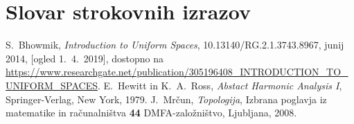 \documentclass[mat1]{fmfdelo}
\begin{document}
\section*{Slovar strokovnih izrazov}

\geslo{}{}
\geslo{}{}

\begin{thebibliography}{99}

S.~Bhowmik, \emph{Introduction to Uniform Spaces}, 10.13140/RG.2.1.3743.8967, junij 2014, [ogled 1.~4.~2019], dostopno na \url{https://www.researchgate.net/publication/305196408_INTRODUCTION_TO_UNIFORM_SPACES}.
E.~Hewitt in K.~A.~Ross, \emph{Abstact Harmonic Analysis I}, Springer-Verlag, New York, 1979.
J.~Mrčun, \emph{Topologija}, Izbrana poglavja iz matematike in računalništva \textbf{44} DMFA-založništvo, Ljubljana, 2008.

\end{thebibliography}
\end{document}

